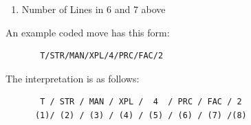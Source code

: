 \documentclass[conference]{IEEEtran}
\begin{document}
\begin{enumerate}
\item {Number of Lines in 6 and 7 above}
\end{enumerate}

An example coded move has this form:
\begin{verbatim}
       T/STR/MAN/XPL/4/PRC/FAC/2
\end{verbatim}

The interpretation is as follows:

\begin{verbatim}
       T / STR / MAN / XPL /  4  / PRC / FAC / 2
      (1)/ (2) / (3) / (4) / (5) / (6) / (7) /(8)
\end{verbatim}
\end{document}
